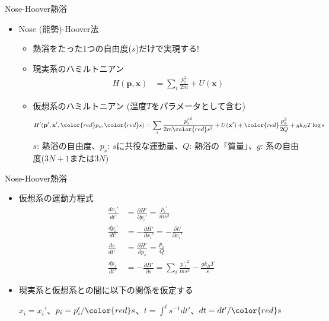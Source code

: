 \documentclass[dvipdfmx]{beamer}
\begin{document}
\begin{frame}[t,fragile]{Nose-Hoover熱浴}
  \begin{itemize}
  \item Nose (能勢)-Hoover法
    \begin{itemize}
    \item 熱浴をたった1つの自由度($s$)だけで実現する!
    \item 現実系のハミルトニアン
      \begin{align*}
        H(\mathbf{p},\mathbf{x}) &= \sum_i \frac{p_i^2}{2m} + U(\mathbf{x})
      \end{align*}
    \item 仮想系のハミルトニアン (温度$T$をパラメータとして含む)
      \begin{align*}
        H'(\mathbf{p}',\mathbf{x}',{\color{red}p_s},{\color{red}s}) &= \sum_i \frac{{p'_i}^2}{2m{\color{red}s^2}} + U(\mathbf{x}') + {\color{red}\frac{p_s^2}{2Q} + g k_B T\log s}
      \end{align*}
      $s$: 熱浴の自由度、$p_s$: $s$に共役な運動量、$Q$: 熱浴の「質量」、$g$: 系の自由度($3N+1$または$3N$)
    \end{itemize}
  \end{itemize}
\end{frame}

\begin{frame}[t,fragile]{Nose-Hoover熱浴}
  \begin{itemize}
  \item 仮想系の運動方程式
    \begin{align*}
      \frac{dx_i'}{dt'} &= \frac{\partial H'}{\partial p_i'} = \frac{p_i'}{ms^2} \\
      \frac{dp_i'}{dt'} &= -\frac{\partial H'}{\partial x_i'} = -\frac{\partial U}{\partial x_i'} \\
      \frac{ds}{dt'} &= \frac{\partial H'}{\partial p_s} = \frac{p_s}{Q} \\
      \frac{dp_s}{dt'} &= -\frac{\partial H'}{\partial s} = \sum_i \frac{{p'_i}^2}{ms^3} - \frac{g k_B T}{s}
    \end{align*}
  \item 現実系と仮想系との間に以下の関係を仮定する

    $x_i=x_i'$、$p_i=p_i'/{\color{red}s}$、$t=\int^t s^{-1} dt'$、$dt=dt'/{\color{red}s}$
  \end{itemize}
\end{frame}
\end{document}
